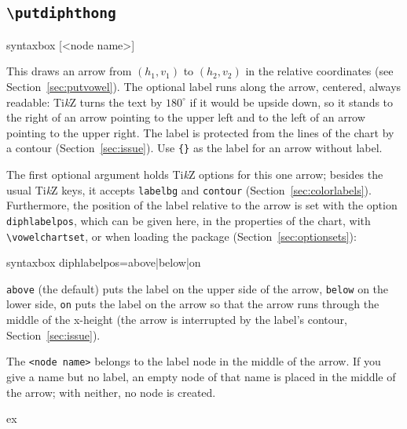 \documentclass[a4paper,11pt]{article}
\newcommand\cmd[1]{\texttt{\textbackslash #1}}
\newcommand\opt[1]{\texttt{#1}}
\begin{document}
\subsection{\cmd{putdiphthong}}\label{sec:diph}

\begin{tcblisting}{syntaxbox}
[<node name>]
\end{tcblisting}

\noindent
This draws an arrow from $(h_1,v_1)$ to $(h_2,v_2)$ in the relative coordinates (see Section~\ref{sec:putvowel}). The optional label runs along the
arrow, centered, always readable: Ti\textit{k}Z turns the text by $180^\circ$ if it would
be upside down, so it stands to the right of an arrow pointing to the upper
left and to the left of an arrow pointing to the upper right. The label is
protected from the lines of the chart by a contour (Section~\ref{sec:issue}). Use \verb|{}| as the label for an arrow without label.

The first optional argument holds Ti\textit{k}Z options for this one arrow; besides the usual Ti\textit{k}Z keys, it accepts \opt{labelbg} and \opt{contour} (Section~\ref{sec:colorlabels}). Furthermore, the position of the label relative to the arrow is set with the option \opt{diphlabelpos}, which can be given here, in the properties of the chart, with \cmd{vowelchartset}, or when loading the package (Section~\ref{sec:optionsets}):

\begin{tcblisting}{syntaxbox}
diphlabelpos=above|below|on
\end{tcblisting}

\noindent
\opt{above} (the default) puts the label on the upper side of the arrow, \opt{below} on the lower side, \opt{on} puts the label on the arrow so that the arrow runs through the middle of the x-height (the arrow is interrupted by the label's contour, Section~\ref{sec:issue}).

The \texttt{<node name>} belongs to the label node in the middle of the arrow. If you give a name but no label, an empty node of that name is placed in the middle of the arrow; with neither, no node is created.

\begin{tcblisting}{ex}
\begin{vowelchart}[width=5cm]
\end{vowelchart}
\end{tcblisting}
\end{document}
